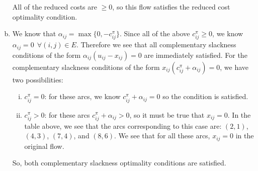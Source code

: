 \documentclass[fleqn]{homework}
\begin{document}
\begin{problem}{4}
\begin{enumerate}[a.]
      All of the reduced costs are $\ge 0$, so this flow satisfies the reduced
      cost optimality condition.

    \item We know that $\alpha_{ij} = \max \{0, -c_{ij}^\pi\}$.  Since all of
      the above $c_{ij}^\pi \ge 0$, we know
      $\alpha_{ij} = 0 \:\: \forall (i,j) \in E$.  Therefore we see that all
      complementary slackness conditions of the form
      $\alpha_{ij}(u_{ij} - x_{ij}) = 0$ are immediately satisfied.  For the
      complementary slackness conditions of the form
      $x_{ij}(c_{ij}^\pi + \alpha_{ij}) = 0$, we have two possibilities:

      \begin{enumerate}[i.]
      \item $c_{ij}^\pi = 0$: for these arcs, we know
        $c_{ij}^\pi + \alpha_{ij} = 0$ so the condition is satisfied.
      \item $c_{ij}^\pi > 0$: for these arcs $c_{ij}^\pi + \alpha_{ij} > 0$, so
        it must be true that $x_{ij} = 0$.  In the table above, we see that the
        arcs corresponding to this case are: $(2,1)$, $(4,3)$, $(7,4)$, and
        $(8,6)$.  We see that for all these arcs, $x_{ij} = 0$ in the original flow.
      \end{enumerate}

      So, both complementary slackness optimality conditions are satisfied.
    \end{enumerate}
  \end{problem}
\end{document}
